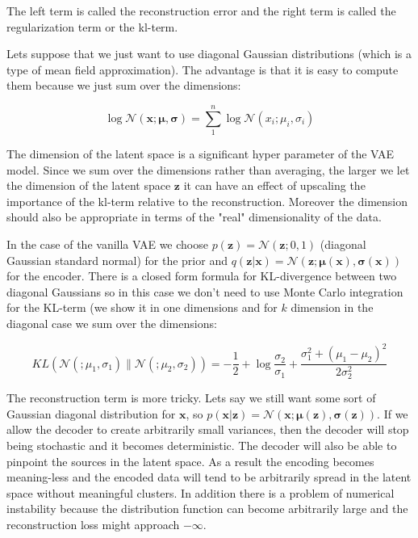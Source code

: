 \documentclass[11pt, a4paper]{report}
\theoremstyle{plain}
\theoremstyle{definition}
\theoremstyle{remark}
\newcommand{\x}{\mathbf{x}}
\newcommand{\z}{\mathbf{z}}
\newcommand{\NN}{\mathcal{N}}
\newcommand{\bv}[1]{\boldsymbol{#1}}
\begin{document}
The left term is called the reconstruction error and the 
right term is called the regularization term or the kl-term.


Lets suppose that we just want to use diagonal Gaussian distributions (which is
a type of mean field approximation).
The advantage is that it is easy to compute them because we just sum over the
dimensions:

\begin{equation}
\label{eq:diagnormal}
\log \NN(\x ; \bv{\mu}, \bv{\sigma}) = 
\sum_1^n \log \NN(x_i ; \mu_i, \sigma_i)
\end{equation}

The dimension of the latent space is a significant hyper parameter of the VAE
model.
Since we sum over the dimensions rather than averaging,
the larger we let the dimension of the latent space $\z$ 
it can have an effect of upscaling the importance of the kl-term relative to the
reconstruction.
Moreover the dimension should also be appropriate in terms of the "real"
dimensionality of the data.

In the case of the vanilla VAE we choose $p(\z) = \NN(\z;0,1)$ (diagonal
Gaussian standard normal) for the prior and 
$q(\z | \x) = \NN(\z ; \bv{\mu}(\x), \bv{\sigma}(\x))$ for the encoder.
There is a closed form formula for KL-divergence between two diagonal Gaussians
so in this case we don't need to use Monte Carlo integration for the KL-term
(we show it in one dimensions and for $k$ dimension in the diagonal case
we sum over the dimensions:

\begin{equation}
\label{eq:kldivnormal}
KL(\NN(;\mu_1, \sigma_1) \| \NN(;\mu_2, \sigma_2)) = 
-\frac{1}{2} + \log \frac{\sigma_2}{\sigma_1}
+ \frac{\sigma_1^2 + (\mu_1 - \mu_2)^2}{2 \sigma_2^2}
\end{equation}

The reconstruction term is more tricky.
Lets say we still want some sort of Gaussian diagonal distribution for $\x$,
so $p(\x | \z) = \NN(\x ; \bv{\mu}(\z), \bv{\sigma}(\z))$.
If we allow the decoder to create arbitrarily small variances, then the
decoder will stop being stochastic and it becomes deterministic. 
The decoder will also be able to pinpoint the sources in the latent space.
As a result the encoding becomes meaning-less and the encoded data will tend to
be arbitrarily spread in the latent space without meaningful clusters.
In addition there is a problem of numerical instability because the distribution
function can become arbitrarily large and the reconstruction loss might approach
$-\infty$.
\end{document}

